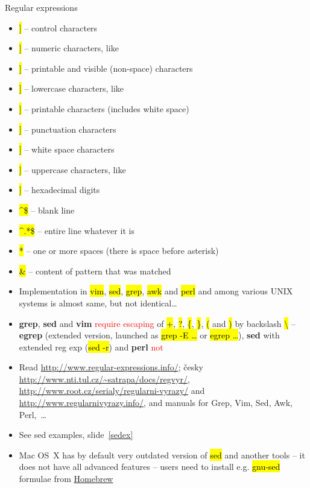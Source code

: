 \documentclass[compress, ucs, xelatex, 11pt, xcolor=svgnames,
  hyperref={
    bookmarks=true,
    unicode=true,
    colorlinks=true,
    pdftitle={Linux, command line and MetaCentrum},
    plainpages=false,
    pdfauthor={Vojtech Zeisek},
    pdfsubject={Course about use of Linux command line, writing shell scripts and using MetaCentrum of CESNET},
    pdfcreator={XeLaTeX},
    pdfkeywords={Linux, GNU, BASH, shell, command line, MetaCentrum},
    linkcolor=DarkRed,
    anchorcolor=DarkBlue,
    citecolor=Indigo,
    filecolor=NavyBlue,
    menucolor=DarkMagenta,
    urlcolor=DarkBlue,
    pdftex},
  url={hyphens, lowtilde} %
  ]{beamer}
\renewcommand{\texttt}[1]{\hl{\ttfamily #1}}
\renewcommand{\alert}[1]{\textcolor{red}{#1}}
\begin{document}
\begin{frame}[allowframebreaks]{Regular expressions}
\begin{itemize}
    \item \alert{\texttt{[[:cntrl:]]}} -- control characters
    \item \alert{\texttt{[[:digit:]]}} -- numeric characters, like \alert{\texttt{[0-9]}}
    \item \alert{\texttt{[[:graph:]]}} -- printable and visible (non-space) characters
    \item \alert{\texttt{[[:lower:]]}} -- lowercase characters, like \alert{\texttt{[a-z]}}
    \item \alert{\texttt{[[:print:]]}} -- printable characters (includes white space)
    \item \alert{\texttt{[[:punct:]]}} -- punctuation characters
    \item \alert{\texttt{[[:space:]]}} -- white space characters
    \item \alert{\texttt{[[:upper:]]}} -- uppercase characters, like \alert{\texttt{[A-Z]}}
    \item \alert{\texttt{[[:xdigit:]]}} -- hexadecimal digits
    \item \alert{\texttt{\textasciicircum\$}} -- blank line
    \item \alert{\texttt{\textasciicircum.*\$}} -- entire line whatever it is
    \item \alert{\texttt{ *}} -- one or more spaces (there is space before asterisk)
    \item \alert{\texttt{\&}} -- content of pattern that was matched
    \item Implementation in \texttt{vim}, \texttt{sed}, \texttt{grep}, \texttt{awk} and \texttt{perl} and among various UNIX systems is almost same, but not identical\ldots
    \item \textbf{grep}, \textbf{sed} and \textbf{vim} \alert{require escaping} of \alert{\texttt{+}}, \alert{\texttt{?}}, \alert{\texttt{\{}}, \alert{\texttt{\}}}, \alert{\texttt{(}} and \alert{\texttt{)}} by backslash \alert{\texttt{\textbackslash}} -- \textbf{egrep} (extended version, launched as \texttt{grep -E \ldots} or \texttt{egrep \ldots}), \textbf{sed} with extended reg exp (\texttt{sed -r}) and \textbf{perl} \alert{not}
    \item Read \url{http://www.regular-expressions.info/}; česky \url{http://www.nti.tul.cz/~satrapa/docs/regvyr/}, \url{http://www.root.cz/serialy/regularni-vyrazy/} and \url{http://www.regularnivyrazy.info/}, and manuals for Grep, Vim, Sed, Awk, Perl,~\ldots
    \item See sed examples, slide~\ref{sedex}
    \item Mac OS~X has by default very outdated version of \texttt{sed} and another tools -- it does not have all advanced features -- users need to install e.g. \texttt{gnu-sed} formulae from \href{http://brew.sh/}{Homebrew}
  \end{itemize}
\end{frame}
\end{document}
